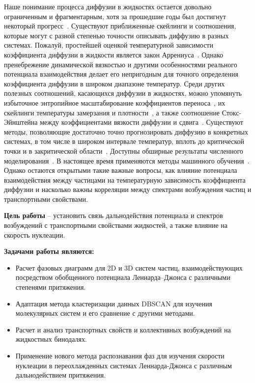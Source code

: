 Наше понимание процесса диффузии в жидкостях остается довольно ограниченным и фрагментарным, хотя за прошедшие годы был достигнут некоторый прогресс~\cite{FrenkelBook,HansenBook,GrootBook,MarchBook}.
Существуют приближенные скейлинги и соотношения, которые могут с разной степенью точности описывать диффузию в разных системах. Пожалуй, простейшей оценкой температурной зависимости коэффициента диффузии в жидкости является закон Аррениуса~\cite{10.1126/science.278.5336.257}. Однако пренебрежение динамической вязкостью и другими особенностями реального потенциала взаимодействия делает его непригодным для точного определения коэффициента диффузии в широком диапазоне температур. Среди других полезных соотношений, касающихся диффузии в жидкостях, можно упомянуть избыточное энтропийное масштабирование коэффициентов переноса~\cite{10.1103/physreva.15.2545, 10.1038/381137a0, 10.1063/1.5055064}, их скейлинги температуры замерзания и плотности~\cite{10.1103/physreve.62.7524, 10.1063/1.5022058, 10.1063/1.5044703, 10.1103/physreve.103.042122}, а также соотношение Стокс-Эйнштейна между коэффициентами вязкости диффузии и сдвига~\cite{10.1063/1.446338, 10.1002/BBPC.19900940313, 10.1103/physreve.95.052122, 10.1063/1.5080662, 10.1080/00268976.2019.1643045}. Существуют методы, позволяющие достаточно точно прогнозировать диффузию в конкретных системах, в том числе в широком интервале температур, вплоть до критической точки и в закритической области~\cite{10.1063/1.1607953, 10.1016/j.camwa.2019.11.012, 10.1063/1.441097}. Доступны обширные результаты численного моделирования~\cite{10.1063/1.1786579, 10.1016/j.fluid.2011.03.002}. В настоящее время применяются методы машинного обучения~\cite{10.1063/5.0011512}.
Однако остаются открытыми такие важные вопросы, как влияние потенциала взаимодействия между частицами на температурную зависимость коэффициента диффузии и насколько важны корреляции между спектрами возбуждения частиц и транспортными свойствами.

\newpage

\textbf{Цель работы} -- установить связь дальнодействия потенциала и спектров возбуждений с транспортными свойствами жидкостей, а также влияние на скорость нуклеации.

\textbf{Задачами работы являются:}
\begin{itemize}
\item Расчет фазовых диаграмм для 2D и 3D систем частиц, взаимодействующих посредством обобщенного потенциала Леннарда--Джонса с различными степенями притяжения.
\item Адаптация метода кластеризации данных DBSCAN для изучения молекулярных систем и его сравнение с другими методами.
\item Расчет и анализ транспортных свойств и коллективных возбуждений на жидкостных бинодалях.
\item Применение нового метода распознавания фаз для изучения скорости нуклеации в переохлажденных системах Леннарда-Джонса с различным дальнодействием притяжения.
\end{itemize}
